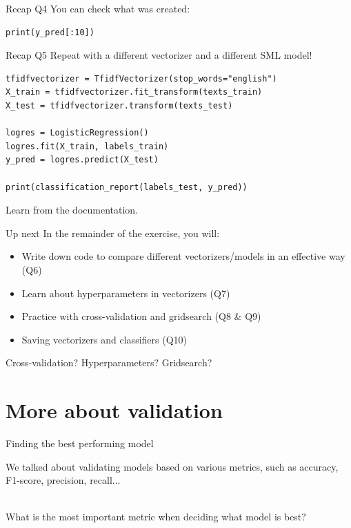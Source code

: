 \documentclass[handout]{beamer}
\begin{document}
\begin{frame}[fragile]{Recap Q4}
You can check what was created:
\begin{lstlisting}
print(y_pred[:10])
\end{lstlisting}

\begin{lstlistingoutput}
\end{lstlistingoutput}
\end{frame}



\begin{frame}[fragile]{Recap Q5}
Repeat with a different vectorizer and a different SML model!
\begin{lstlisting}
tfidfvectorizer = TfidfVectorizer(stop_words="english")
X_train = tfidfvectorizer.fit_transform(texts_train)
X_test = tfidfvectorizer.transform(texts_test)

logres = LogisticRegression()
logres.fit(X_train, labels_train)
y_pred = logres.predict(X_test)

print(classification_report(labels_test, y_pred))
\end{lstlisting}

Learn from the documentation.
\end{frame}


\begin{frame}{Up next}
In the remainder of the exercise, you will:
\begin{itemize}
\item Write down code to compare different vectorizers/models in an effective way (Q6)
		\item Learn about hyperparameters in vectorizers (Q7)
		\item Practice with cross-validation and gridsearch (Q8 \& Q9)
		\item Saving vectorizers and classifiers (Q10) 
\end{itemize}

Cross-validation? Hyperparameters? Gridsearch?
\end{frame}



\section{More about validation}

\begin{frame}{Finding the best performing model}

We talked about validating models based on various metrics, such as accuracy, F1-score, precision, recall... \\\

What is the most important metric when deciding what model is best?
\end{frame}
\end{document}
